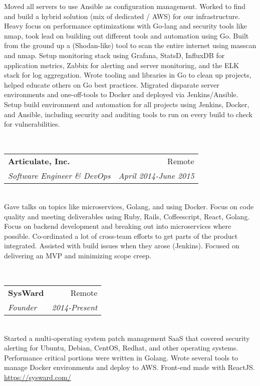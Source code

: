 \documentclass[a4paper,11pt,sans]{article}
\makeatletter
\newcommand{\ressubheading}[4]{
\begin{tabular*}{7.0in}{l@{\extracolsep{\fill}}r}
		\textbf{#1} & #2 \\
		\textit{#3} & \textit{#4} \\
\end{tabular*}\vspace{-6pt}}
\makeatother
\begin{document}
Moved all servers to use Ansible as configuration management. Worked to find and build a hybrid solution (mix of dedicated / AWS) for our infrastructure. Heavy focus on performance optimizations with Go-lang and security tools like nmap, took lead on building out different tools and automation using Go. Built from the ground up a (Shodan-like) tool to scan the entire internet using masscan and nmap. Setup monitoring stack using Grafana, StatsD, InfluxDB for application metrics, Zabbix for alerting and server monitoring, and the ELK stack for log aggregation. Wrote tooling and libraries in Go to clean up projects, helped educate others on Go best practices. Migrated disparate server environments and one-off-tools to Docker and deployed via Jenkins/Ansible. Setup build environment and automation for all projects using Jenkins, Docker, and Ansible, including security and auditing tools to run on every build to check for vulnerabilities.

\hspace{5pt} \\

\ressubheading{Articulate, Inc.}{Remote}{Software Engineer \& DevOps}{April 2014-June 2015}

\hspace{5pt} \\

Gave talks on topics like microservices, Golang, and using Docker. Focus on code quality and meeting deliverables using Ruby, Rails, Coffeescript, React, Golang. Focus on backend development and breaking out into microservices where possible. Co-ordinated a lot of cross-team efforts to get parts of the product integrated. Assisted with build issues when they arose (Jenkins). Focused on delivering an MVP and minimizing scope creep.

\hspace{5pt} \\

\ressubheading{SysWard}{Remote}{Founder}{2014-Present}

\hspace{5pt} \\

Started a multi-operating system patch management SaaS that covered security alerting for Ubuntu, Debian, CentOS, Redhat, and other operating systems. Performance critical portions were written in Golang. Wrote several tools to manage Docker environments and deploy to AWS. Front-end made with ReactJS. \url{https://sysward.com/}
\end{document}
